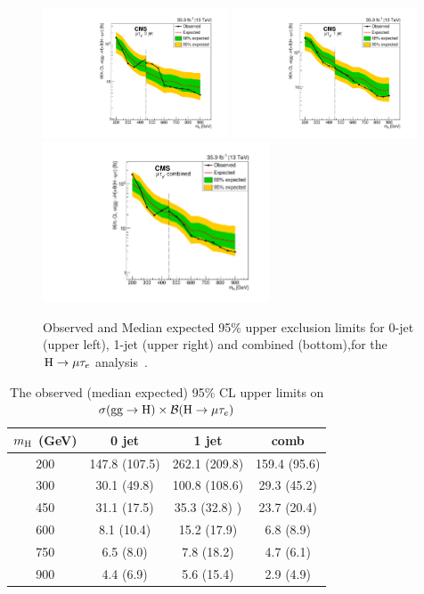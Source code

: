 \begin{figure}[!htpb]\centering
 \includegraphics[width=0.49\textwidth]{plots_and_figures/chapter8/highmass/Figure_004-c.pdf}
 \includegraphics[width=0.49\textwidth]{plots_and_figures/chapter8/highmass/Figure_004-d.pdf} \\
 \includegraphics[width=0.60\textwidth]{plots_and_figures/chapter8/highmass/Figure_005-b.pdf}
\caption{Observed and Median expected 95\% upper exclusion limits for 0-jet (upper left), 1-jet (upper right) and combined (bottom),for the $\text{H} \to \mu \tau_{e}$ analysis~\cite{HIG-18-017}.}
 \label{fig:limits_Hmue}
\end{figure}



\begin{table}
\caption{The observed (median expected) 95\% CL upper limits on $\sigma(\textrm{gg}\rightarrow \text{H}) \times\mathcal{B}(\text{H} \to \mu \tau_{e})$}
\begin{center}
\begin{tabular}{c|c|c|c}
\hline
$m_{\text{H}}$ (GeV) & 0 jet & 1 jet  & comb\\
\hline
200 &147.8 (107.5) & 262.1 (209.8)& 159.4 (95.6) \\
300 &30.1 (49.8) & 100.8 (108.6) & 29.3 (45.2) \\
450 &31.1 (17.5) & 35.3 (32.8) )& 23.7 (20.4) \\
600 &8.1 (10.4)& 15.2 (17.9)& 6.8 (8.9) \\
750 &6.5 (8.0)& 7.8 (18.2)& 4.7 (6.1) \\
900 &4.4 (6.9)& 5.6 (15.4)& 2.9 (4.9) \\
\hline
\end{tabular}
\label{table:limits_Hmue}
\end{center}
\end{table}


